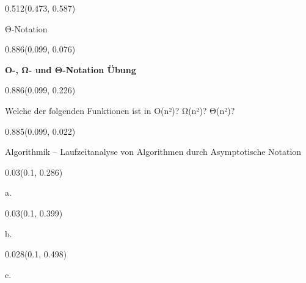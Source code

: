 \documentclass[aspectratio=169]{beamer}
\begin{document}
\begin{frame}[fragile]
\begin{textblock}{0.512}(0.473, 0.587)
  \begin{minipage}[t][0.064\paperheight]{\linewidth}
    {\tiny Θ-Notation}
  \end{minipage}
\end{textblock}

\begin{textblock}{0.886}(0.099, 0.076)
  \begin{minipage}[t][0.131\paperheight]{\linewidth}
    \textbf{O-, Ω- und Θ-Notation Übung}
  \end{minipage}
\end{textblock}

\begin{textblock}{0.886}(0.099, 0.226)
  \begin{minipage}[t][0.63\paperheight]{\linewidth}
    {\small Welche der folgenden Funktionen ist in O(n²)? Ω(n²)? Θ(n²)?}
  \end{minipage}
\end{textblock}

\begin{textblock}{0.885}(0.099, 0.022)
  \begin{minipage}[b][0.031\paperheight]{\linewidth}
    {\tiny Algorithmik – Laufzeitanalyse von Algorithmen durch Asymptotische Notation}
  \end{minipage}
\end{textblock}

\begin{textblock}{0.03}(0.1, 0.286)
  \begin{minipage}[t][0.054\paperheight]{\linewidth}
    {\tiny a.}
  \end{minipage}
\end{textblock}

\begin{textblock}{0.03}(0.1, 0.399)
  \begin{minipage}[t][0.054\paperheight]{\linewidth}
    {\tiny b.}
  \end{minipage}
\end{textblock}

\begin{textblock}{0.028}(0.1, 0.498)
  \begin{minipage}[t][0.054\paperheight]{\linewidth}
    {\tiny c.}
  \end{minipage}
\end{textblock}


\end{frame}
\end{document}
